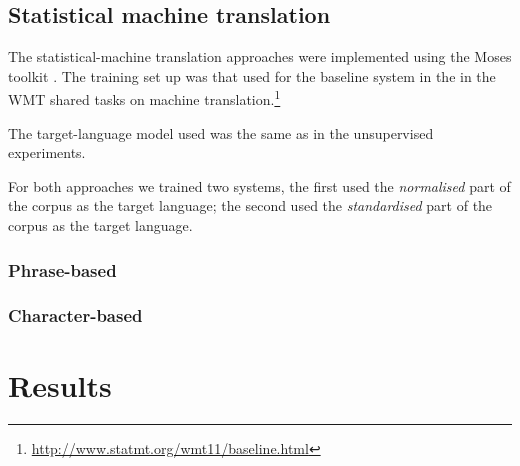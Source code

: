 \documentclass[11pt]{article}
\begin{document}
%

\subsection{Statistical machine translation}


The statistical-machine translation approaches were implemented using the 
Moses toolkit \cite{koehn2007}. The training set up was that used for
the baseline system in the  in the WMT shared tasks
on machine translation.\footnote{\url{http://www.statmt.org/wmt11/baseline.html}}

The target-language model used was the same as in the unsupervised experiments. 

For both approaches we trained two systems, the first used the \emph{normalised}
part of the corpus as the target language; the second used the \emph{standardised} 
part of the corpus as the target language.

\subsubsection{Phrase-based}

\subsubsection{Character-based}

\cite{nakov2012}

\section{Results}
\end{document}
